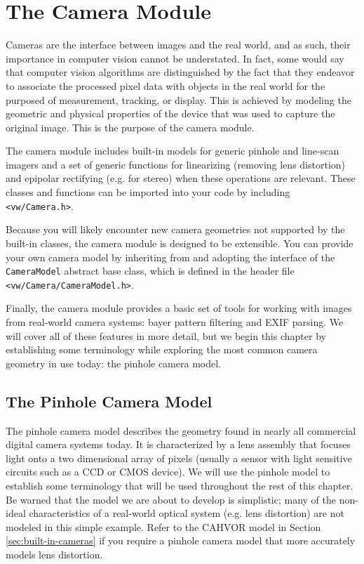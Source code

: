 \chapter{The Camera Module}

Cameras are the interface between images and the real world, and as
such, their importance in computer vision cannot be understated.  In
fact, some would say that computer vision algorithms are distinguished
by the fact that they endeavor to associate the processed pixel data
with objects in the real world for the purposed of measurement,
tracking, or display.  This is achieved by modeling the geometric and
physical properties of the device that was used to capture the
original image.  This is the purpose of the camera module.

The camera module includes built-in models for generic pinhole and
line-scan imagers and a set of generic functions for linearizing
(removing lens distortion) and epipolar rectifying (e.g. for stereo)
when these operations are relevant.  These classes and functions can
be imported into your code by including {\tt <vw/Camera.h>}.

Because you will likely encounter new camera geometries not supported
by the built-in classes, the camera module is designed to be
extensible.  You can provide your own camera model by inheriting
from and adopting the interface of the {\tt CameraModel} abstract base
class, which is defined in the header file {\tt <vw/Camera/CameraModel.h>}.

Finally, the camera module provides a basic set of tools for working
with images from real-world camera systems: bayer pattern filtering
and EXIF parsing.  We will cover all of these features in more detail,
but we begin this chapter by establishing some terminology while
exploring the most common camera geometry in use today: the pinhole
camera model.

\section{The Pinhole Camera Model}
The pinhole camera model describes the geometry found in nearly all
commercial digital camera systems today.  It is characterized by a
lens assembly that focuses light onto a two dimensional array of
pixels (usually a sensor with light sensitive circuits such as a CCD
or CMOS device).  We will use the pinhole model to establish some
terminology that will be used throughout the rest of this chapter.  Be
warned that the model we are about to develop is simplistic; many of
the non-ideal characteristics of a real-world optical system
(e.g. lens distortion) are not modeled in this simple example.  Refer
to the CAHVOR model in Section \ref{sec:built-in-cameras} if you
require a pinhole camera model that more accurately models lens
distortion.

